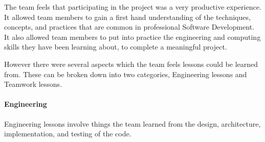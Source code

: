 \documentclass[11pt]{article}
\begin{document}
The team feels that participating in the project was a very productive experience. It allowed team members to gain a first hand understanding of the techniques, concepts, and practices that are common in professional Software Development. It also allowed team members to put into practice the engineering and computing skills they have been learning about, to complete a meaningful project. 

However there were several aspects which the team feels lessons could be learned from.
These can be broken down into two categories, Engineering lessons and Teamwork lessons.

\paragraph{Engineering}

Engineering lessons involve things the team learned from the design, architecture, implementation, and testing of the code.
\end{document}
